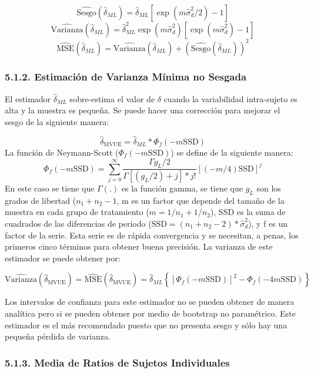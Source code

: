 \documentclass[]{article}
\begin{document}
\[\hat{\textrm{Sesgo}}(\hat{\delta}_{ML}) = \hat{\delta}_{ML}\left [\exp(m\hat{\sigma}_{d}^{2}/2)-1\right ]\]
\[
\hat{\textrm{Varianza}}(\hat{\delta}_{ML}) = \hat{\delta}_{ML}^{2}\exp(m\hat{\sigma}_{d}^{2})\left [\exp(m\hat{\sigma}_{d}^{2})-1\right]
\] \[
\hat{\textrm{MSE}}(\hat{\delta}_{ML})=\hat{\textrm{Varianza}}(\hat{\delta}_{ML})+\left(\hat{\textrm{Sesgo}}(\hat{\delta}_{ML})\right)^{2}
\]

\subsubsection{5.1.2. Estimación de Varianza Mínima no
Sesgada}\label{estimacion-de-varianza-minima-no-sesgada}

El estimador \(\hat{\delta}_{ML}\) sobre-estima el valor de \(\delta\)
cuando la variabilidad intra-sujeto es alta y la muestra es pequeña. Se
puede hacer una corrección para mejorar el sesgo de la siguiente manera:

\[
\hat{\delta}_{\textrm{MVUE}} = \hat{\delta}_{ML}*\Phi_{f}(-m\textrm{SSD})
\] La función de Neymann-Scott (\(\Phi_{f}(-m\textrm{SSD})\)) se define
de la siguiente manera:\\
\[
\Phi_{f}(-m\textrm{SSD})=\sum_{j=0}^{\infty}{\frac{\Gamma{g_{L}/2}}{\Gamma{\left[(g_{L}/2)+j\right]}*j!}\left [(-m/4)\textrm{SSD}\right]^{j}}
\] En este caso se tiene que \(\Gamma{(.)}\) es la función gamma, se
tiene que \(g_{L}\) son los grados de libertad (\(n_{1}+n_{2}-1\), m es
un factor que depende del tamaño de la muestra en cada grupo de
tratamiento (\(m = 1/n_{1} + 1/n_{2}\)), SSD es la suma de cuadrados de
las diferencias de periodo
(\(\textrm{SSD} = (n_{1}+n_{2}-2)*\hat{\sigma}_{d}^{2}\)), y f es un
factor de la serie. Esta serie es de rápida convergencia y se necesitan,
a penas, los primeros cinco términos para obtener buena precisión. La
varianza de este estimador se puede obtener por:

\[\hat{\textrm{Varianza}}(\hat{\delta}_{\textrm{MVUE}}) = \hat{\textrm{MSE}}(\hat{\delta}_{\textrm{MVUE}})=\hat{\delta}_{ML}\left\{\left[\Phi_{f}(-m\textrm{SSD})\right]^{2}-\Phi_{f}(-4m\textrm{SSD})\right\}\]

Los intervalos de confianza para este estimador no se pueden obtener de
manera analítica pero si se pueden obtener por medio de bootstrap no
paramétrico. Este estimador es el más recomendado puesto que no presenta
sesgo y sólo hay una pequeña pérdida de varianza.

\subsubsection{5.1.3. Media de Ratios de Sujetos
Individuales}\label{media-de-ratios-de-sujetos-individuales}
\end{document}
